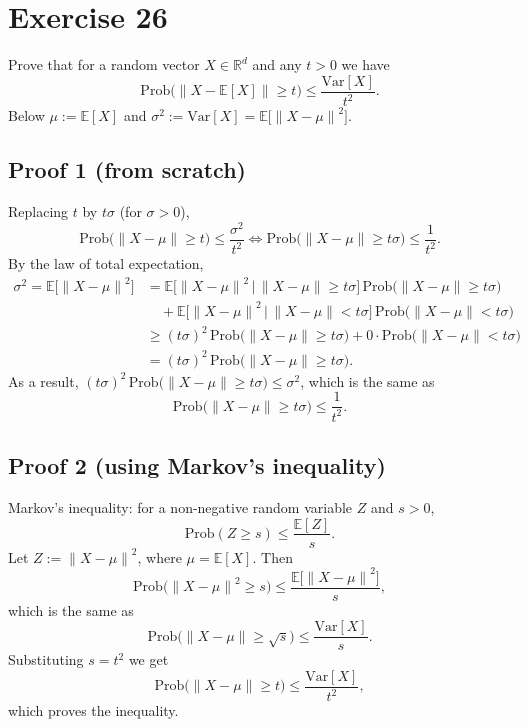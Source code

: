 \documentclass[11pt,a4paper]{article}
\newcommand{\R}{\mathbb{R}}
\newcommand{\E}{\mathbb{E}}
\newcommand{\norm}[1]{\left\| #1 \right\|}
\begin{document}
\section*{Exercise 26}

Prove that for a random vector $X \in \R^d$ and any $t > 0$ we have
\[
  \mathrm{Prob}\bigl(\norm{X - \E[X]} \ge t\bigr) \le \frac{\mathrm{Var}[X]}{t^2} .
\]
Below $\mu := \E[X]$ and $\sigma^2 := \mathrm{Var}[X] = \E\bigl[\norm{X - \mu}^2\bigr]$.

\subsection*{Proof 1 (from scratch)}
Replacing $t$ by $t\sigma$ (for $\sigma > 0$),
\[
  \mathrm{Prob}\bigl(\norm{X - \mu} \ge t\bigr) \le \frac{\sigma^2}{t^2}
  \iff
  \mathrm{Prob}\bigl(\norm{X - \mu} \ge t\sigma\bigr) \le \frac{1}{t^2} .
\]
By the law of total expectation,
\begin{align*}
  \sigma^2 = \E\bigl[\norm{X - \mu}^2\bigr]
  &= \E\bigl[\norm{X - \mu}^2 \,\big|\, \norm{X - \mu} \ge t\sigma\bigr]\,
     \mathrm{Prob}\bigl(\norm{X - \mu} \ge t\sigma\bigr) \\
  &\quad + \E\bigl[\norm{X - \mu}^2 \,\big|\, \norm{X - \mu} < t\sigma\bigr]\,
     \mathrm{Prob}\bigl(\norm{X - \mu} < t\sigma\bigr) \\
  &\ge (t\sigma)^2\,\mathrm{Prob}\bigl(\norm{X - \mu} \ge t\sigma\bigr)
     + 0\cdot\mathrm{Prob}\bigl(\norm{X - \mu} < t\sigma\bigr) \\
  &= (t\sigma)^2\,\mathrm{Prob}\bigl(\norm{X - \mu} \ge t\sigma\bigr).
\end{align*}
As a result, $(t\sigma)^2\,\mathrm{Prob}\bigl(\norm{X - \mu} \ge t\sigma\bigr) \le \sigma^2$, which is the same as
\[
  \mathrm{Prob}\bigl(\norm{X - \mu} \ge t\sigma\bigr) \le \frac{1}{t^2} .
\]

\subsection*{Proof 2 (using Markov's inequality)}
Markov's inequality: for a non-negative random variable $Z$ and $s > 0$,
\[
  \mathrm{Prob}(Z \ge s) \le \frac{\E[Z]}{s} .
\]
Let $Z := \norm{X - \mu}^2$, where $\mu = \E[X]$. Then
\[
  \mathrm{Prob}\bigl(\norm{X - \mu}^2 \ge s\bigr) \le \frac{\E\bigl[\norm{X - \mu}^2\bigr]}{s},
\]
which is the same as
\[
  \mathrm{Prob}\bigl(\norm{X - \mu} \ge \sqrt{s}\bigr) \le \frac{\mathrm{Var}[X]}{s} .
\]
Substituting $s = t^2$ we get
\[
  \mathrm{Prob}\bigl(\norm{X - \mu} \ge t\bigr) \le \frac{\mathrm{Var}[X]}{t^2},
\]
which proves the inequality.
\end{document}
